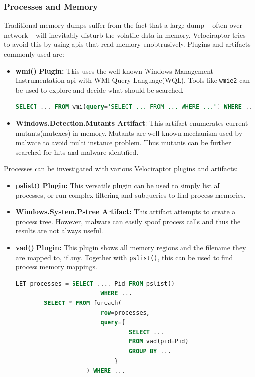 \documentclass[a4paper, 11pt, oneside]{article} %
\begin{document}
\subsubsection{Processes and Memory}
Traditional memory dumps suffer from the fact that a large dump -- often over network -- will inevitably disturb the volatile data in memory. Velociraptor tries to avoid this by using apis that read memory unobtrusively. Plugins and artifacts commonly used are:
\begin{itemize}
    \item \textbf{wmi() Plugin:} This uses the well known Windows Management Instrumentation api with WMI Query Language(WQL). Tools like \verb|wmie2| can be used to explore and decide what should be searched.
    \begin{lstlisting}[basicstyle=\ttfamily, breaklines=true, language=SQL]
        SELECT ... FROM wmi(query="SELECT ... FROM ... WHERE ...") WHERE ...
    \end{lstlisting}
    \item \textbf{Windows.Detection.Mutants Artifact:} This artifact enumerates current mutants(mutexes) in memory. Mutants are well known mechanism used by malware to avoid multi instance problem. Thus mutants can be further searched for hits and malware identified.
\end{itemize}
Processes can be investigated with various Velociraptor plugins and artifacts:
\begin{itemize}
    \item \textbf{pslist() Plugin:} This versatile plugin can be used to simply list all processes, or run complex filtering and subqueries to find process memories.
    \item \textbf{Windows.System.Pstree Artifact:} This artifact attempts to create a process tree. However, malware can easily spoof process calls and thus the results are not always useful.
    \item \textbf{vad() Plugin:} This plugin shows all memory regions and the filename they are mapped to, if any. Together with \verb|pslist()|, this can be used to find process memory mappings. 
    \begin{lstlisting}[basicstyle=\ttfamily, breaklines=true, language=SQL]
        LET processes = SELECT ..., Pid FROM pslist()
                        WHERE ...
        SELECT * FROM foreach(
                        row=processes,
                        query={
                                SELECT ...
                                FROM vad(pid=Pid)
                                GROUP BY ...
                            }
                    ) WHERE ...
    \end{lstlisting}
\end{itemize}
\end{document}
